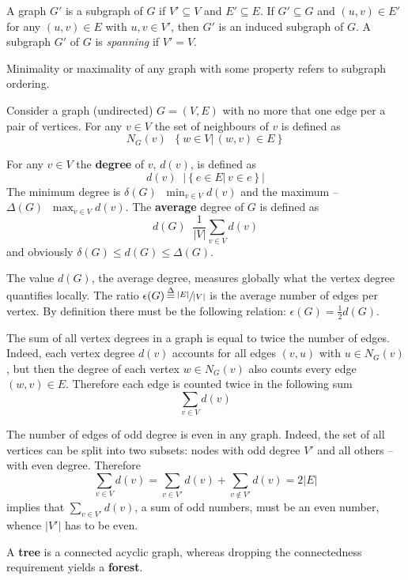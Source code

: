 \documentclass[a4paper]{article}
\newcommand{\obj}[1]{{\left\{ #1 \right \}}}
\newcommand{\induc}[1]{{\left . #1 \right \vert}}
\newcommand{\abs}[1]{{\left | #1 \right |}}
\newcommand{\defn}{\mathop{\overset{\Delta}{=}}\nolimits}
\begin{document}
A graph $G'$ is a subgraph of $G$ if $V'\subseteq V$ and $E'\subseteq E$.
If $G'\subseteq G$ and $(u,v)\in E'$ for any $(u,v)\in E$ with $u,v\in V'$, then $G'$ is an induced subgraph of $G$.
A subgraph $G'$ of $G$ is \emph{spanning} if $V'=V$.

Minimality or maximality of any graph with some property refers to subgraph ordering.

Consider a graph (undirected) $G=(V,E)$ with no more that one edge per a pair of vertices.
For any $v\in V$ the set of neighbours of $v$ is defined as
\[N_G(v) \defn \obj{\induc{w\in V}\, (w,v)\in E}\]

For any $v\in V$ the \textbf{degree} of $v$, $d(v)$, is defined as
\[d(v) \defn \abs{\obj{\induc{ e\in E }\, v\in e }}\]
The minimum degree is $\delta(G)\defn \min_{v\in V} d(v)$ and the maximum -- $\Delta(G) \defn \max_{v\in V} d(v)$.
The \textbf{average} degree of $G$ is defined as \[d(G) \defn \frac{1}{\abs{V}} \sum_{v\in V} d(v)\] and obviously $\delta(G)\leq d(G)\leq \Delta(G)$.

The value $d(G)$, the average degree, measures globally what the vertex degree quantifies locally.
The ratio $\epsilon(G) \defn \sfrac{\abs{E}}{\abs{V}}$ is the average number of edges per vertex.
By definition there must be the following relation: $\epsilon(G) = \frac{1}{2} d(G)$.

The sum of all vertex degrees in a graph is equal to twice the number of edges.
Indeed, each vertex degree $d(v)$ accounts for all edges $(v,u)$ with $u\in N_G(v)$,
but then the degree of each vertex $w\in N_G(v)$ also counts every edge $(w,v)\in E$.
Therefore each edge is counted twice in the following sum
\[\sum_{v\in V} d(v)\]

The number of edges of odd degree is even in any graph.
Indeed, the set of all vertices can be split into two subsets:
nodes with odd degree $V'$ and all others -- with even degree.
Therefore \[\sum_{v\in V}d(v) = \sum_{v\in V'}d(v) + \sum_{v\notin V'} d(v) = 2 \abs{E}\]
implies that $\sum_{v\in V'} d(v)$, a sum of odd numbers, must be an even number, whence $\abs{V'}$ has to be even.








A \textbf{tree} is a connected acyclic graph, whereas dropping the
connectedness requirement yields a \textbf{forest}.
\end{document}
